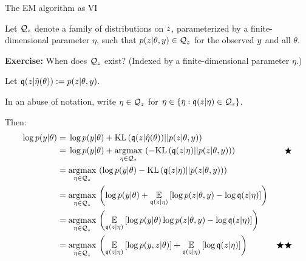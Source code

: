 
\begin{frame}{The EM algorithm as VI}

Let $\mathcal{Q}_z$ denote a family of distributions on $z$, parameterized by a
finite-dimensional parameter $\eta$, such that $p(z | \theta, y) \in \mathcal{Q}_z$
for the observed $y$ and all $\theta$.

\textbf{Exercise:} When does $\mathcal{Q}_z$ exist?  (Indexed by a
finite-dimensional parameter $\eta$.)

\pause

Let $\mathfrak{q}(z | \hat{\eta}(\theta)) := p(z | \theta, y)$.

In an abuse of notation,
write $\eta \in \mathcal{Q}_z$ for $\eta \in \{\eta: \mathfrak{q}(z | \eta) \in \mathcal{Q}_z \}$.

\pause

Then:
%
\begin{align*}
%
\log p(\y | \theta) ={}&
\log p(\y | \theta) + \kl{\q(\z | \etaopt(\theta))}{p(\z | \theta, \y)}
\\={}&
\log p(\y | \theta) + \argmax{\eta \in \qdom_z}\left( -
    \kl{\q(\z | \eta)}{p(\z | \theta, \y)} \right) & \bigstar
\\={}&
\argmax{\eta \in \qdom_z} \left(
    \log p(\y | \theta) -
    \kl{\q(\z | \eta)}{p(\z | \theta, \y)}\right)
\\={}&
\argmax{\eta \in \qdom_z} \left(
\log p(\y | \theta) +
\expect{\q(\z | \eta)}{
    \log p(\z | \theta, \y) - \log \q(\z | \eta)
}\right)
\\={}&
\argmax{\eta \in \qdom_z} \left(
\expect{\q(\z | \eta)}{
    \log p(\y | \theta)
    \log p(\z | \theta, \y) -  \log \q(\z | \eta)
}\right)
\\={}&
\argmax{\eta \in \qdom_z} \left(
\expect{\q(\z | \eta)}{
    \log p(\y, \z | \theta) }
+ \expect{\q(\z | \eta)}{\log \q(\z | \eta)
}\right) & \bigstar\bigstar
%
\end{align*}
%
\end{frame}




